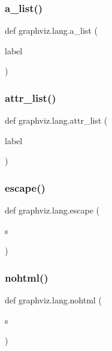\subsubsection{\texorpdfstring{a\+\_\+list()}{a\_list()}}
{\footnotesize\ttfamily def graphviz.\+lang.\+a\+\_\+list (\begin{DoxyParamCaption}\item[{}]{label }\end{DoxyParamCaption})}

\mbox{\label{namespacegraphviz_1_1lang_ac77163e4ddccb315c741433db4ba13e3}} 
\subsubsection{\texorpdfstring{attr\+\_\+list()}{attr\_list()}}
{\footnotesize\ttfamily def graphviz.\+lang.\+attr\+\_\+list (\begin{DoxyParamCaption}\item[{}]{label }\end{DoxyParamCaption})}

\mbox{\label{namespacegraphviz_1_1lang_a8a01a7a47f0f88a7bb35bb0d980902a3}} 
\subsubsection{\texorpdfstring{escape()}{escape()}}
{\footnotesize\ttfamily def graphviz.\+lang.\+escape (\begin{DoxyParamCaption}\item[{}]{s }\end{DoxyParamCaption})}

\mbox{\label{namespacegraphviz_1_1lang_a364494c427b4b98855394e2c3e61e574}} 
\subsubsection{\texorpdfstring{nohtml()}{nohtml()}}
{\footnotesize\ttfamily def graphviz.\+lang.\+nohtml (\begin{DoxyParamCaption}\item[{}]{s }\end{DoxyParamCaption})}

